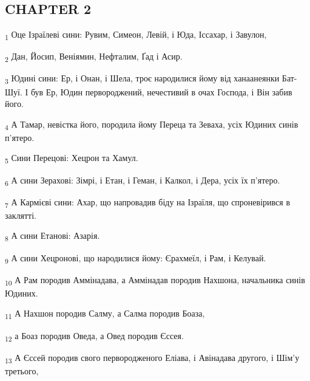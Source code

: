 \subsection{CHAPTER 2}
\begin{tcolorbox}
\textsubscript{1} Оце Ізраїлеві сини: Рувим, Симеон, Левій, і Юда, Іссахар, і Завулон,
\end{tcolorbox}
\begin{tcolorbox}
\textsubscript{2} Дан, Йосип, Веніямин, Нефталим, Ґад і Асир.
\end{tcolorbox}
\begin{tcolorbox}
\textsubscript{3} Юдині сини: Ер, і Онан, і Шела, троє народилися йому від ханаанеянки Бат-Шуї. І був Ер, Юдин первороджений, нечестивий в очах Господа, і Він забив його.
\end{tcolorbox}
\begin{tcolorbox}
\textsubscript{4} А Тамар, невістка його, породила йому Переца та Зеваха, усіх Юдиних синів п'ятеро.
\end{tcolorbox}
\begin{tcolorbox}
\textsubscript{5} Сини Перецові: Хецрон та Хамул.
\end{tcolorbox}
\begin{tcolorbox}
\textsubscript{6} А сини Зерахові: Зімрі, і Етан, і Геман, і Калкол, і Дера, усіх їх п'ятеро.
\end{tcolorbox}
\begin{tcolorbox}
\textsubscript{7} А Кармієві сини: Ахар, що напровадив біду на Ізраїля, що спроневірився в заклятті.
\end{tcolorbox}
\begin{tcolorbox}
\textsubscript{8} А сини Етанові: Азарія.
\end{tcolorbox}
\begin{tcolorbox}
\textsubscript{9} А сини Хецронові, що народилися йому: Єрахмеїл, і Рам, і Келувай.
\end{tcolorbox}
\begin{tcolorbox}
\textsubscript{10} А Рам породив Аммінадава, а Аммінадав породив Нахшона, начальника синів Юдиних.
\end{tcolorbox}
\begin{tcolorbox}
\textsubscript{11} А Нахшон породив Салму, а Салма породив Боаза,
\end{tcolorbox}
\begin{tcolorbox}
\textsubscript{12} а Боаз породив Оведа, а Овед породив Єссея.
\end{tcolorbox}
\begin{tcolorbox}
\textsubscript{13} А Єссей породив свого первородженого Еліава, і Авінадава другого, і Шім'у третього,
\end{tcolorbox}

